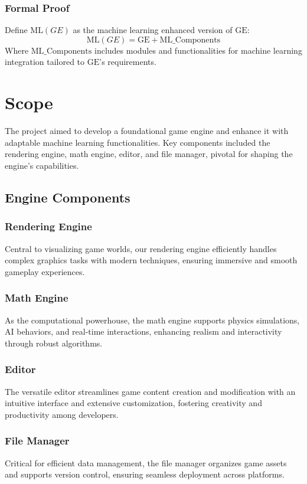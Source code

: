 \subsubsection*{Formal Proof}
Define \( \text{ML}(GE) \) as the machine learning enhanced version of \( \text{GE} \):
\[
\text{ML}(GE) = \text{GE} + \text{ML\_Components}
\]
Where \( \text{ML\_Components} \) includes modules and functionalities for machine learning integration tailored to \( \text{GE} \)'s requirements.



\pagebreak


\section*{Scope}

The project aimed to develop a foundational game engine and enhance it with adaptable machine learning functionalities. Key components included the rendering engine, math engine, editor, and file manager, pivotal for shaping the engine's capabilities.

\subsection*{Engine Components}

\subsubsection*{Rendering Engine}
Central to visualizing game worlds, our rendering engine efficiently handles complex graphics tasks with modern techniques, ensuring immersive and smooth gameplay experiences.

\subsubsection*{Math Engine}
As the computational powerhouse, the math engine supports physics simulations, AI behaviors, and real-time interactions, enhancing realism and interactivity through robust algorithms.

\subsubsection*{Editor}
The versatile editor streamlines game content creation and modification with an intuitive interface and extensive customization, fostering creativity and productivity among developers.

\subsubsection*{File Manager}
Critical for efficient data management, the file manager organizes game assets and supports version control, ensuring seamless deployment across platforms.

